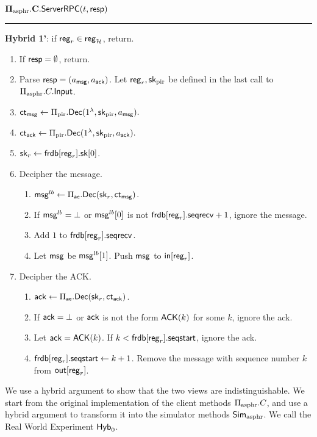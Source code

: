 \vspace{10pt}
$\mathbf{\Pi_{\text{asphr}}.C.\mathsf{ServerRPC}}(t, \mathsf{resp})$
\vspace{5pt}
\hrule
\vspace{5pt}
{\color{red} \textbf{Hybrid 1'}: if $\mathsf{reg}_r \in \mathsf{reg}_{\mathcal{H}}$, return.}
\begin{enumerate}
    \item If $\mathsf{resp} = \emptyset$, return.
    \item Parse $\mathsf{resp} = (a_{\mathsf{msg}}, a_{\mathsf{ack}})$. Let $\mathsf{reg}_r, {\mathsf{sk}}_{\text{pir}}$ be defined in the last call to $\Pi_{\text{asphr}}.C.\mathsf{Input}$.
    \item $\mathsf{ct}_{\mathsf{msg}} \leftarrow \Pi_{\text{pir}}.\mathsf{Dec}(1^{\lambda}, {\mathsf{sk}}_{\text{pir}}, a_{\mathsf{msg}}).$
    \item $\mathsf{ct}_{\mathsf{ack}} \leftarrow \Pi_{\text{pir}}.\mathsf{Dec}(1^{\lambda}, {\mathsf{sk}}_{\text{pir}}, a_{\mathsf{ack}}).$
    \item ${\mathsf{sk}}_r \leftarrow \mathsf{frdb}[\mathsf{reg}_r].{\mathsf{sk}}[0]$.
    \item Decipher the message.
    \begin{enumerate}
        \item $\mathsf{msg}^{lb} \leftarrow \Pi_{\mathsf{ae}}.\mathsf{Dec}({\mathsf{sk}}_r, \mathsf{ct}_{\mathsf{msg}})$.
        \item If $\mathsf{msg}^{lb} = \bot$ or $\mathsf{msg}^{lb}[0]$ is not $\mathsf{frdb}[\mathsf{reg}_r].\mathsf{seqrecv} + 1$, ignore the message.
        \item Add $1$ to $\mathsf{frdb}[\mathsf{reg}_r].\mathsf{seqrecv}$. 
        \item Let $\mathsf{msg}$ be $\mathsf{msg}^{lb}[1]$. Push $\mathsf{msg}$ to $\mathsf{in}[\mathsf{reg}_r]$.
    \end{enumerate}
    \item Decipher the ACK.
    \begin{enumerate}
        \item $\mathsf{ack} \leftarrow \Pi_{\mathsf{ae}}.\mathsf{Dec}({\mathsf{sk}}_r, \mathsf{ct}_{\mathsf{ack}})$.
        \item If $\mathsf{ack} = \bot$ or $\mathsf{ack}$ is not the form $\mathsf{ACK}(k)$ for some $k$, ignore the ack.
        \item Let $\mathsf{ack} = \mathsf{ACK}(k)$. If $k < \mathsf{frdb}[\mathsf{reg}_r].\mathsf{seqstart}$, ignore the ack.
        \item $\mathsf{frdb}[\mathsf{reg}_r].\mathsf{seqstart} \leftarrow k + 1$. Remove the message with sequence number $k$ from $\mathsf{out}[\mathsf{reg}_r]$.
    \end{enumerate}
\end{enumerate}

We use a hybrid argument to show that the two views are indistinguishable. We start from the original implementation of the client methods $\Pi_{\text{asphr}}.C$, and use a hybrid argument to transform it into the simulator methods $\mathsf{Sim}_{\text{asphr}}$. We call the Real World Experiment $\mathsf{Hyb}_0$.  

